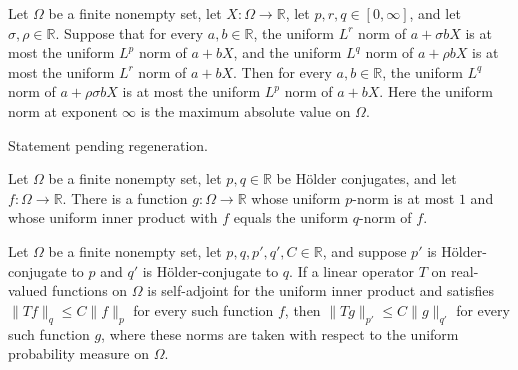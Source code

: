\begin{theorem}
\label{FABL.IsHypercontractiveRandomVariable.comp}
\leanok
{}
Let $\Omega$ be a finite nonempty set, let $X:\Omega\to\mathbb R$, let
$p,r,q\in[0,\infty]$, and let $\sigma,\rho\in\mathbb R$. Suppose that for every
$a,b\in\mathbb R$, the uniform $L^r$ norm of $a+\sigma bX$ is at most the uniform
$L^p$ norm of $a+bX$, and the uniform $L^q$ norm of $a+\rho bX$ is at most the uniform
$L^r$ norm of $a+bX$. Then for every $a,b\in\mathbb R$, the uniform $L^q$ norm of
$a+\rho\sigma bX$ is at most the uniform $L^p$ norm of $a+bX$. Here the uniform norm
at exponent $\infty$ is the maximum absolute value on $\Omega$.
\end{theorem}

\begin{theorem}
\label{FABL.IsHypercontractiveRandomVariable.mono_rho_of_meanZero}
\leanok
{}
Statement pending regeneration.
\end{theorem}

\begin{theorem}
\label{FABL.exists_uniformLpNorm_dual}
\leanok
{}
Let $\Omega$ be a finite nonempty set, let $p,q\in\mathbb R$ be Hölder conjugates, and
let $f:\Omega\to\mathbb R$. There is a function $g:\Omega\to\mathbb R$ whose uniform
$p$-norm is at most $1$ and whose uniform inner product with $f$ equals the uniform
$q$-norm of $f$.
\end{theorem}

\begin{theorem}
\label{FABL.selfAdjoint_dual_bound}
\leanok
{}
Let $\Omega$ be a finite nonempty set, let $p,q,p',q',C\in\mathbb R$, and suppose $p'$
is Hölder-conjugate to $p$ and $q'$ is Hölder-conjugate to $q$. If a linear operator $T$
on real-valued functions on $\Omega$ is self-adjoint for the uniform inner product and
satisfies $\|Tf\|_q\le C\|f\|_p$ for every such function $f$, then $\|Tg\|_{p'}\le
C\|g\|_{q'}$ for every such function $g$, where these norms are taken with respect to
the uniform probability measure on $\Omega$.
\end{theorem}

